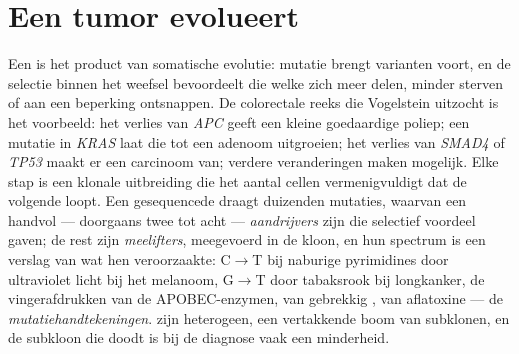 \section{Een tumor evolueert}

\begin{proposition}\label{prop:b3:cancer-biology:multistep}
Een  is het product van somatische evolutie: mutatie brengt
varianten voort, en de selectie binnen het weefsel bevoordeelt die
welke zich meer delen, minder sterven of aan een beperking ontsnappen.
De colorectale reeks die Vogelstein uitzocht is het voorbeeld: het
verlies van \emph{APC} geeft een kleine goedaardige poliep; een mutatie
in \emph{KRAS} laat die tot een adenoom uitgroeien; het verlies van
\emph{SMAD4} of \emph{TP53} maakt er een carcinoom van; verdere
veranderingen maken  mogelijk. Elke stap is een klonale
uitbreiding die het aantal cellen vermenigvuldigt dat de volgende
loopt. Een gesequencede  draagt duizenden mutaties, waarvan een
handvol --- doorgaans twee tot acht --- \emph{aandrijvers} zijn die
selectief voordeel gaven; de rest zijn \emph{meelifters}, meegevoerd in
de kloon, en hun spectrum is een verslag van wat hen veroorzaakte:
C$\to$T bij naburige pyrimidines door ultraviolet licht bij het
melanoom, G$\to$T door tabaksrook bij longkanker, de vingerafdrukken
van de APOBEC-enzymen, van gebrekkig , van aflatoxine
--- de \emph{mutatiehandtekeningen}.  zijn heterogeen, een
vertakkende boom van subklonen, en de subkloon die doodt is bij de
diagnose vaak een minderheid.
\end{proposition}

